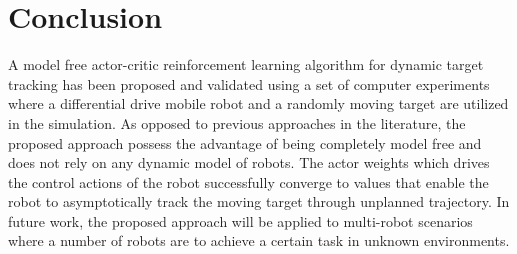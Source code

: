 \documentclass[conference]{IEEEtran}
\begin{document}
\section{Conclusion} \label{sec:conclusion}

A model free actor-critic reinforcement learning algorithm for dynamic target
tracking has been proposed and validated using a set of computer experiments  
where a differential drive mobile robot and a randomly moving target are
utilized in the simulation. As opposed to previous approaches in the literature,
the proposed approach possess the advantage of being completely model free and
does not  rely on any dynamic model of robots. The actor weights which
drives the control actions of the robot successfully converge to values that
enable the robot to asymptotically track the moving target through unplanned
trajectory. In future work, the proposed approach will be applied to multi-robot scenarios
where a number of robots are to achieve a certain task in unknown environments.
 


	

\end{document}
